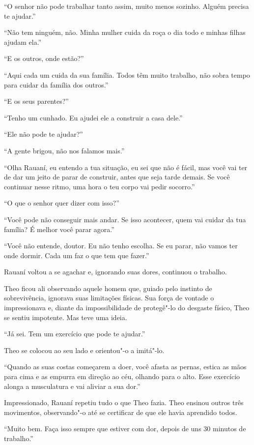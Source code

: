``O senhor não pode trabalhar tanto assim, muito menos sozinho. Alguém
precisa te ajudar.''

``Não tem ninguém, não. Minha mulher cuida da roça o dia todo e minhas
filhas ajudam ela.''

``E os outros, onde estão?''

``Aqui cada um cuida da sua família. Todos têm muito trabalho, não sobra
tempo para cuidar da família dos outros.''

``E os seus parentes?''

``Tenho um cunhado. Eu ajudei ele a construir a casa dele.''

``Ele não pode te ajudar?''

``A gente brigou, não nos falamos mais.''

``Olha Rauaní, eu entendo a tua situação, eu sei que não é fácil, mas
você vai ter de dar um jeito de parar de construir, antes que seja tarde
demais. Se você continuar nesse ritmo, uma hora o teu corpo vai pedir
socorro.''

``O que o senhor quer dizer com isso?''

``Você pode não conseguir mais andar. Se isso acontecer, quem vai cuidar
da tua família? É melhor você parar agora.''

``Você não entende, doutor. Eu não tenho escolha. Se eu parar, não vamos
ter onde dormir. Cada um faz o que tem que fazer.''

Rauaní voltou a se agachar e, ignorando suas dores, continuou o
trabalho.

Theo ficou ali observando aquele homem que, guiado
pelo instinto de sobrevivência, ignorava suas limitações físicas. Sua
força de vontade o impressionava e, diante da impossibilidade de
protegê"-lo do desgaste físico, Theo se sentiu impotente. Mas teve uma
ideia.

``Já sei. Tem um exercício que pode te ajudar.''

Theo se colocou ao seu lado e orientou"-o a imitá"-lo.

``Quando as suas costas começarem a doer, você afasta as pernas, estica
as mãos para cima e as empurra em direção ao céu, olhando para o alto.
Esse exercício alonga a musculatura e vai aliviar a sua dor.''

Impressionado, Rauaní repetiu tudo o que Theo fazia. Theo ensinou outros
três movimentos, observando"-o até se certificar de que ele havia
aprendido todos.

``Muito bem. Faça isso sempre que estiver com dor, depois de uns 30
minutos de trabalho.''

